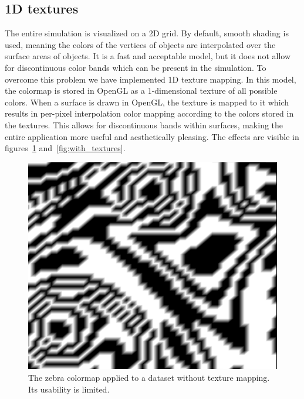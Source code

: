 	\subsection{1D textures}
		The entire simulation is visualized on a 2D grid.
		By default, smooth shading is used, meaning the colors of the vertices of objects are interpolated over the surface areas of objects.
		It is a fast and acceptable model, but it does not allow for discontinuous color bands which can be present in the simulation.
		To overcome this problem we have implemented 1D texture mapping.
		In this model, the colormap is stored in OpenGL as a 1-dimensional texture of all possible colors.
		When a surface is drawn in OpenGL, the texture is mapped to it which results in per-pixel interpolation color mapping according to the colors stored in the textures. 
		This allows for discontinuous bands within surfaces, making the entire application more useful and aesthetically pleasing.
		The effects are visible in figures~\ref{fig:without_textures} and~\ref{fig:with_textures}.
		\begin{figure}[htb]
			  \centering
			  \includegraphics[scale=.2]{./content/pictures/zebra_regular.png}
			  \caption{The zebra colormap applied to a dataset without texture mapping. Its usability is limited.}
			  \label{fig:without_textures}
		\end{figure}
